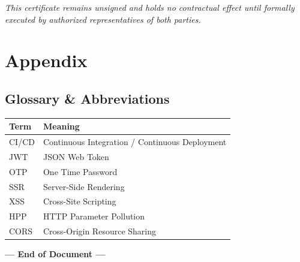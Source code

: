 \documentclass[11pt,a4paper]{article}
\begin{document}
\vspace{0.8cm}
\noindent\emph{This certificate remains unsigned and holds no contractual
effect until formally executed by authorized representatives of both
parties.}

\newpage
\section{Appendix}
\subsection*{Glossary \& Abbreviations}
\begin{longtable}{@{}p{3cm}p{11.5cm}@{}}
    \toprule
    \textbf{Term} & \textbf{Meaning} \\
    \midrule
    \endhead
    CI/CD & Continuous Integration / Continuous Deployment \\
    JWT   & JSON Web Token \\
    OTP   & One Time Password \\
    SSR   & Server-Side Rendering \\
    XSS   & Cross-Site Scripting \\
    HPP   & HTTP Parameter Pollution \\
    CORS  & Cross-Origin Resource Sharing \\
    \bottomrule
\end{longtable}

\vspace{1cm}
\begin{center}
    \textbf{--- End of Document ---}
\end{center}
\end{document}
